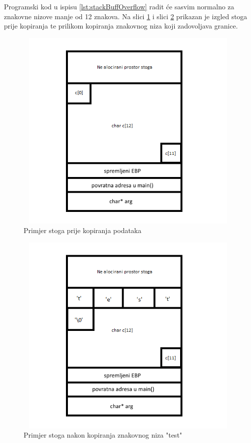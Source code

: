 \documentclass[times, utf8, diplomski, numeric]{fer}
\begin{document}
Programski kod u ispisu \ref{lst:stackBuffOverflow} radit će
sasvim normalno za znakovne nizove manje od 12 znakova. Na slici 
\ref{fig:buff_overflow_nodata} i slici 
\ref{fig:buff_overflow_legitdata} prikazan je izgled stoga prije
kopiranja te prilikom kopiranja znakovnog niza koji zadovoljava
granice.

\begin{figure}[!ht]
\centering
\setlength\fboxsep{0pt}
\setlength\fboxrule{0.5pt}
\includegraphics[width=12cm, height=10cm]{slike/buffer_overflow_nodata}
\caption{Primjer stoga prije kopiranja podataka}
\label{fig:buff_overflow_nodata} 
\end{figure} 

\begin{figure}[!ht]
\centering
\setlength\fboxsep{0pt}
\setlength\fboxrule{0.5pt}
\includegraphics[width=12cm, height=10cm]{slike/buffer_overflow_legitdata}
\caption{Primjer stoga nakon kopiranja znakovnog niza "test"}
\label{fig:buff_overflow_legitdata} 
\end{figure} 
\end{document}
